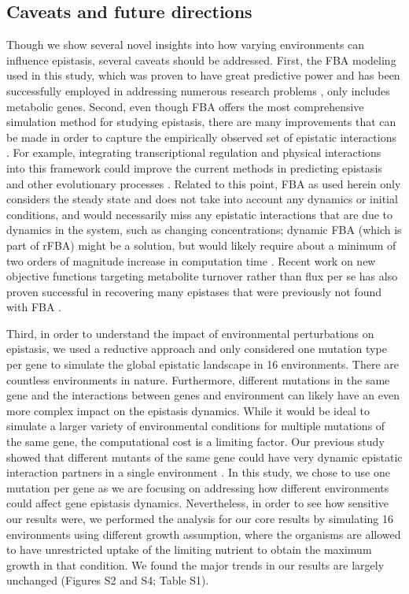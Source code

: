 \subsection{Caveats and future directions} Though we show several
novel insights into how varying environments can influence epistasis,
several caveats should be addressed. First, the FBA modeling used in
this study, which was proven to have great predictive power and has
been successfully employed in addressing numerous research problems
\citep{Edwards2001, Shlomi2005, Smallbone2009a}, 
only includes metabolic genes. Second, even though FBA
offers the most comprehensive simulation method for studying
epistasis, there are many improvements that can be made in order to
capture the empirically observed set of epistatic interactions
\citep{Covert2001}. For example, integrating transcriptional
regulation and physical interactions into this framework could improve
the current methods in predicting epistasis and other evolutionary
processes \citep{Szappanos2011}. Related to
this point, FBA as used herein only considers the steady state and
does not take into account any dynamics or initial conditions, and
would necessarily miss any epistatic interactions that are due to
dynamics in the system, such as changing concentrations; dynamic FBA
(which is part of rFBA) might be a solution, but would likely require
about a minimum of two orders of magnitude increase in computation
time \citep{Covert2001, Varma1994}. Recent work
on new objective functions targeting metabolite turnover rather than
flux per se has also proven successful in recovering many epistases
that were previously not found with FBA \citep{Brochado2012}.

Third, in order to understand the impact of environmental
perturbations on epistasis, we used a reductive approach and only
considered one mutation type per gene to simulate the global epistatic
landscape in 16 environments. There are countless environments in
nature. Furthermore, different mutations in the same gene and the
interactions between genes and environment can likely have an even
more complex impact on the epistasis dynamics. While it would be ideal
to simulate a larger variety of environmental conditions for multiple
mutations of the same gene, the computational cost is a limiting
factor. Our previous study showed that different mutants of the same
gene could have very dynamic epistatic interaction partners in a
single environment \citep{Xu2012}. In this study, we chose to use one
mutation per gene as we are focusing on addressing how different
environments could affect gene epistasis dynamics. Nevertheless, in
order to see how sensitive our results were, we performed the analysis
for our core results by simulating 16 environments using different
growth assumption, where the organisms are allowed to have
unrestricted uptake of the limiting nutrient to obtain the maximum
growth in that condition. We found the major trends in our results are
largely unchanged (Figures S2 and S4; Table S1).

